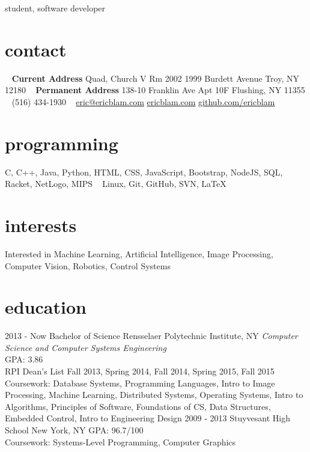 \documentclass[]{friggeri-cv}
\begin{document}
       {student, software developer}


\begin{aside}
  \section{contact}
    ~
    \textbf{Current Address}
    Quad, Church V
    Rm 2002
    1999 Burdett Avenue
    Troy, NY 12180
    ~
    \textbf{Permanent Address}
    138-10 Franklin Ave
    Apt 10F
    Flushing, NY 11355
    ~
    (516) 434-1930
    ~
    \href{mailto:adrien@friggeri.net}{eric@ericblam.com}
    \href{http://ericblam.com}{ericblam.com}
    \href{http://github.com/ericblam}{github.com/ericblam}
  \section{programming}
    C, C++, Java, Python, HTML, CSS, JavaScript, Bootstrap, NodeJS, SQL, Racket, NetLogo, MIPS
    ~
    Linux, Git, GitHub, SVN, \LaTeX
\end{aside}

\section{interests}

Interested in Machine Learning, Artificial Intelligence, Image Processing, Computer Vision, Robotics, Control Systems

\section{education}

\begin{entrylist}
  \entry
    {2013 - Now}
    {Bachelor of Science}
    {Rensselaer Polytechnic Institute, NY}
    {\emph{Computer Science and Computer Systems Engineering}\\
    GPA: 3.86\\
    RPI Dean's List Fall 2013, Spring 2014, Fall 2014, Spring 2015, Fall 2015\\
    Coursework: Database Systems, Programming Languages, Intro to Image Processing, Machine Learning, Distributed Systems, Operating Systems, Intro to Algorithms, Principles of Software, Foundations of CS, Data Structures, Embedded Control, Intro to Engineering Design}
  \entry
    {2009 - 2013}
    {Stuyvesant High School}
    {New York, NY}
    {GPA: 96.7/100\\
    Coursework: Systems-Level Programming, Computer Graphics}
\end{entrylist}
\end{document}

